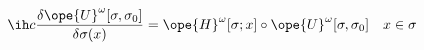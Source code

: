 \begin{equation}	\label{12.106new1}
\ih c \frac{\delta\ope{U}^\omega[\sigma,\sigma_0]}{\delta\sigma(x)}
=
\ope{H}^\omega[\sigma;x]\circ \ope{U}^\omega[\sigma,\sigma_0]
\quad
x\in\sigma
	\end{equation}

